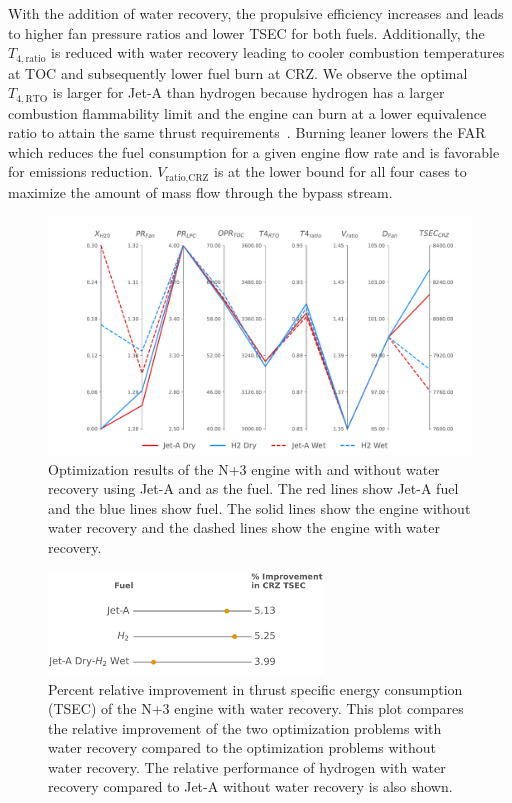 \documentclass[conf]{new-aiaa}
\begin{document}
With the addition of water recovery, the propulsive efficiency increases and leads to higher fan pressure ratios and lower TSEC for both fuels.
Additionally, the $T_{4,\text{ratio}}$ is reduced with water recovery leading to cooler combustion temperatures at TOC and subsequently lower fuel burn at CRZ.
We observe the optimal $T_{4,\text{RTO}}$ is larger for Jet-A than hydrogen because hydrogen has a larger combustion flammability limit and the engine can burn at a lower equivalence ratio to attain the same thrust requirements~\cite{Adler2023}.
Burning leaner lowers the FAR which reduces the fuel consumption for a given engine flow rate and is favorable for emissions reduction.
$V_\text{ratio,CRZ}$ is at the lower bound for all four cases to maximize the amount of mass flow through the bypass stream.

\begin{figure}[hbt!]
  \centering
  \includegraphics[width=1.0\textwidth]{N3_parallel_coords.pdf}
  \caption{Optimization results of the N+3 engine with and without water recovery using Jet-A and  as the fuel.
    The red lines show Jet-A fuel and the blue lines show  fuel.
    The solid lines show the engine without water recovery and the dashed lines show the engine with water recovery.}
  \label{fig:parallel_coords}
\end{figure}

\begin{figure}[hbt!]
  \centering
  \includegraphics[width=0.65\textwidth]{bar_chart.pdf}
  \caption{Percent relative improvement in thrust specific energy consumption (TSEC) of the N+3 engine with water recovery.
    This plot compares the relative improvement of the two optimization problems with water recovery compared to the optimization problems without water recovery.
    The relative performance of hydrogen with water recovery compared to Jet-A without water recovery is also shown.}
  \label{fig:barchart}
\end{figure}
\end{document}
